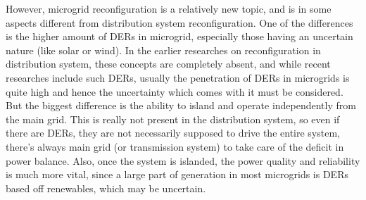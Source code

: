 However, microgrid reconfiguration is a relatively new topic, and is in some aspects different from distribution system reconfiguration. One of the differences is the higher amount of DERs in microgrid, especially those having an uncertain nature (like solar or wind). In the earlier researches on reconfiguration in distribution system, these concepts are completely absent, and while recent researches include such DERs, usually the penetration of DERs in microgrids is quite high and hence the uncertainty which comes with it must be considered. But the biggest difference is the ability to island and operate independently from the main grid. This is really not present in the distribution system, so even if there are DERs, they are not necessarily supposed to drive the entire system, there's always main grid (or transmission system) to take care of the deficit in power balance. Also, once the system is islanded, the power quality and reliability is much more vital, since a large part of generation in most microgrids is DERs based off renewables, which may be uncertain.

